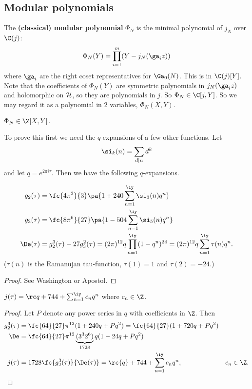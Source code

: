 \subsection{Modular polynomials}
\begin{df}
The \textbf{(classical) modular polynomial} $\Phi_N$ is the minimal polynomial of $j_N$ over $\C(j)$:
\[
\Phi_N(Y)=\prod_{i=1}^m (Y-j_N(\ga_i z))
\]
where $\ga_i$ are the right coset representatives for $\Ga_0(N)$. This is in $\C(j)[Y]$. 
Note that the coefficients of $\Phi_N(Y)$ are symmetric polynomials in $j_N(\ga_iz)$ and holomorphic on $\cal H$, so they are polynomials in $j$. So $\Phi_N\in \C[j,Y]$. So we may regard it as a polynomial in 2 variables, $\Phi_N(X,Y)$.
\end{df}
\begin{thm}\label{thm:PhiZ}
$\Phi_N\in \Z[X,Y]$.
\end{thm}
To prove this first we need the $q$-expansions of a few other functions. Let
\[
\si_k(n)=\sum_{d\mid n}d^k
\]
and let $q=e^{2\pi i \tau}$. Then we have the following $q$-expansions.
\begin{thm}
\begin{align*}
g_2(\tau)&=\fc{4\pi^3}{3}\pa{1+240\sum_{n=1}^{\iy} \si_3(n)q^n}\\
g_3(\tau)&=\fc{8\pi^6}{27}\pa{1-504\sum_{n=1}^{\iy}
\si_5(n)q^n}\\
\De(\tau)&=g_2^3(\tau)-27g_3^2(\tau) = (2\pi)^{12}q\prod_{n=1}^{\iy}(1-q^n)^{24} = (2\pi)^{12} q\sum_{n=1}^{\iy} \tau(n)q^n.
\end{align*}
($\tau(n)$ is the Ramanujan tau-function, $\tau(1)=1$ and $\tau(2)=-24$.)
\end{thm}
\begin{proof}See Washington or Apostol.
\end{proof}
\begin{cor}
$j(\tau)=\rc q+744 +\sum_{n=1}^{\iy} c_nq^n$ where $c_n\in \Z$.
\end{cor}
\begin{proof}
Let $P$ denote any power series in $q$ with coefficients in $\Z$. Then
\begin{align*}
g_2^3(\tau)&=\fc{64}{27}\pi^{12}(1+240q+Pq^2)=\fc{64}{27} (1+720q+Pq^2)\\
\De&=\fc{64}{27} \pi^{12}\underbrace{(3^32^6)}_{1728} q(1-24q+Pq^2)\\
j(\tau)&=1728\fc{g_2^3(\tau)}{\De(\tau)}=\rc{q}+744+\sum_{n=1}^{\iy} c_nq^n,&c_n\in \Z.
\end{align*}
\end{proof}
